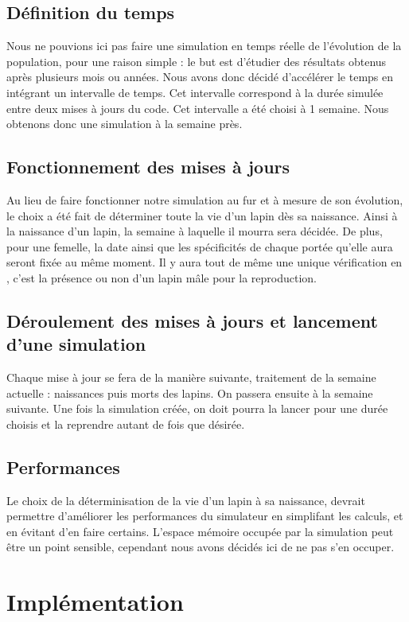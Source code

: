 \documentclass[11pt,a4paper]{article}
\begin{document}
        \subsection{Définition du temps}
            Nous ne pouvions ici pas faire une simulation en temps réelle de l'évolution de la population, pour une raison simple : le but est d'étudier des résultats obtenus après plusieurs mois ou années.
            Nous avons donc décidé d'accélérer le temps en intégrant un intervalle de temps. Cet intervalle correspond à la durée simulée entre deux mises à jours du code. Cet intervalle a été choisi à 1 semaine.
            Nous obtenons donc une simulation  à la semaine près.
        \subsection{Fonctionnement des mises à jours}
            Au lieu de faire fonctionner notre simulation au fur et à mesure de son évolution, le choix a été fait de déterminer toute la vie d'un lapin dès sa naissance.
            Ainsi à la naissance d'un lapin, la semaine à laquelle il mourra sera décidée. De plus, pour une femelle, la date ainsi que les spécificités de chaque portée qu'elle aura seront fixée au même moment.
            Il y aura tout de même une unique vérification en , c'est la présence ou non d'un lapin mâle pour la reproduction.
        \subsection{Déroulement des mises à jours et lancement d'une simulation}
            Chaque mise à jour se fera de la manière suivante, traitement de la semaine actuelle : naissances puis morts des lapins. On passera ensuite à la semaine suivante.
            Une fois la simulation créée, on doit pourra la lancer pour une durée choisis et la reprendre autant de fois que désirée.
        \subsection{Performances}
            Le choix de la déterminisation de la vie d'un lapin à sa naissance, devrait permettre d'améliorer les performances du simulateur en simplifant les calculs, et en évitant d'en faire certains.
            L'espace mémoire occupée par la simulation peut être un point sensible, cependant nous avons décidés ici de ne pas s'en occuper.
\section{Implémentation}
\end{document}
